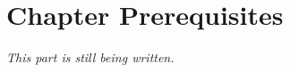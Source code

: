 \addtocounter{section}{-1}
\section{Chapter Prerequisites}
\prereqIntro


\emph{This part is still being written.}

\clearpage
